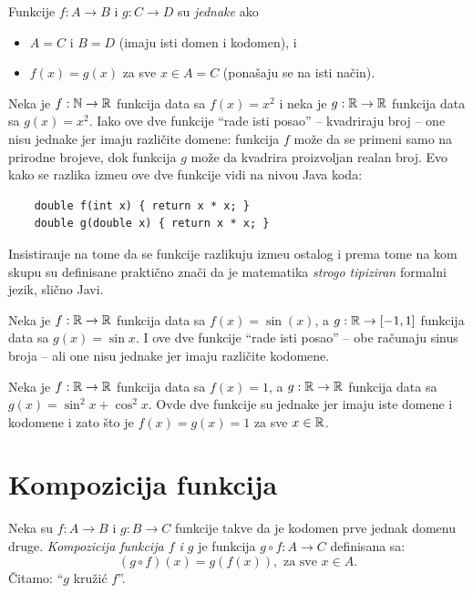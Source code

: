 \begin{DEF}
  Funkcije $f : A \to B$ i $g : C \to D$ su \emph{jednake} ako
  \begin{itemize}\itemsep -1.5pt
  \item
    $A = C$ i $B = D$ (imaju isti domen i kodomen), i
  \item
    $f(x) = g(x)$ za sve $x \in A = C$ (pona\v saju se na isti na\v cin).
  \end{itemize}
\end{DEF}

\begin{EX}
  Neka je $f : \mathbb{N} \to \mathbb{R}$ funkcija data sa $f(x) = x^2$ i neka je $g : \mathbb{R} \to \mathbb{R}$ funkcija data sa $g(x) = x^2$.
  Iako ove dve funkcije \enquote{rade isti posao} -- kvadriraju broj -- one nisu jednake jer imaju razli\v cite domene:
  funkcija $f$ mo\v ze da se primeni samo na prirodne brojeve, dok funkcija $g$ mo\v ze da kvadrira proizvoljan
  realan broj. Evo kako se razlika izme\dj u ove dve funkcije vidi na nivou Java koda:
  {\small
  \begin{verbatim}
    double f(int x) { return x * x; }
    double g(double x) { return x * x; }\end{verbatim}}
  Insistiranje na tome da se funkcije razlikuju izme\dj u ostalog i prema tome na kom skupu su definisane
  prakti\v cno zna\v ci da je matematika \emph{strogo tipiziran} formalni jezik, sli\v cno Javi.
\end{EX}

\begin{EX}
  Neka je $f : \mathbb{R} \to \mathbb{R}$ funkcija data sa $f(x) = \sin(x)$, a $g : \mathbb{R} \to [-1,1]$ funkcija data sa $g(x) = \sin x$.
  I ove dve funkcije \enquote{rade isti posao} -- obe ra\v cunaju sinus broja -- ali one nisu jednake jer imaju razli\v cite kodomene.
\end{EX}

\begin{EX}
  Neka je $f : \mathbb{R} \to \mathbb{R}$ funkcija data sa $f(x) = 1$, a $g : \mathbb{R} \to \mathbb{R}$ funkcija data sa $g(x) = \sin^2 x + \cos^2 x$.
  Ovde dve funkcije su jednake jer imaju iste domene i kodomene i zato \v sto je $f(x) = g(x) = 1$ za sve $x \in \mathbb{R}$.
\end{EX}

\section{Kompozicija funkcija}

\noindent
\begin{minipage}{3in}
  \begin{DEF}
  Neka su $f : A \to B$ i $g : B \to C$ funkcije takve da je kodomen prve jednak domenu druge. \emph{Kompozicija funkcija $f$ i $g$}
  je funkcija $g \circ f : A \to C$ definisana sa:
  $$
    (g \circ f)(x) = g(f(x)), \text{\ \ za sve\ \ } x \in A.
  $$
  \v Citamo: \enquote{$g$ kru\v zi\'c $f$}.
  \end{DEF}
\end{minipage}
\hfill
\begin{minipage}{2.5in}
  \begin{center}
    
  \end{center}
\end{minipage}

